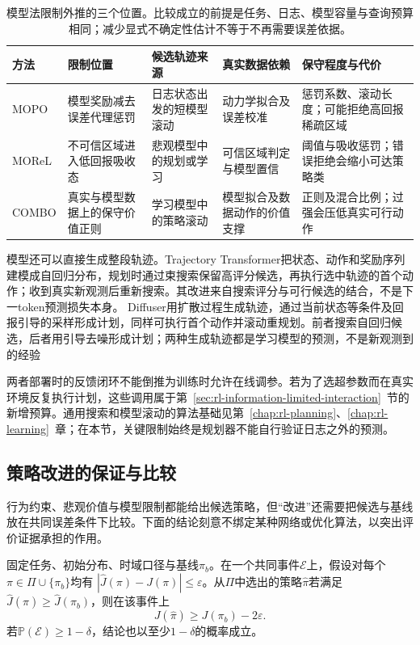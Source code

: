 \begin{table}[t]
  \centering
  \small
  \begin{tabularx}{\linewidth}{p{17mm}XXXX}
    \toprule
    方法 & 限制位置 & 候选轨迹来源 & 真实数据依赖 & 保守程度与代价 \\
    \midrule
    MOPO & 模型奖励减去误差代理惩罚 & 日志状态出发的短模型滚动 & 动力学拟合及误差校准 & 惩罚系数、滚动长度；可能拒绝高回报稀疏区域 \\
    MOReL & 不可信区域进入低回报吸收态 & 悲观模型中的规划或学习 & 可信区域判定与模型置信 & 阈值与吸收惩罚；错误拒绝会缩小可达策略类 \\
    COMBO & 真实与模型数据上的保守价值正则 & 学习模型中的策略滚动 & 模型拟合及数据动作的价值支撑 & 正则及混合比例；过强会压低真实可行动作 \\
    \bottomrule
  \end{tabularx}
  \caption{模型法限制外推的三个位置。比较成立的前提是任务、日志、模型容量与查询预算相同；减少显式不确定性估计不等于不再需要误差依据。}
  \label{tab:rl-information-model-methods}
\end{table}

模型还可以直接生成整段轨迹。Trajectory Transformer把状态、动作和奖励序列建模成自回归分布，规划时通过束搜索保留高评分候选，再执行选中轨迹的首个动作；收到真实新观测后重新搜索。其改进来自搜索评分与可行候选的结合，不是下一token预测损失本身。
Diffuser用扩散过程生成轨迹，通过当前状态等条件及回报引导的采样形成计划，同样可执行首个动作并滚动重规划。前者搜索自回归候选，后者用引导去噪形成计划；两种生成轨迹都是学习模型的预测，不是新观测到的经验

两者部署时的反馈闭环不能倒推为训练时允许在线调参。若为了选超参数而在真实环境反复执行计划，这些调用属于第~\ref{sec:rl-information-limited-interaction}~节的新增预算。通用搜索和模型滚动的算法基础见第~\ref{chap:rl-planning}、\ref{chap:rl-learning}~章；在本节，关键限制始终是规划器不能自行验证日志之外的预测。

\subsection{策略改进的保证与比较}
\label{sec:rl-information-improvement}

行为约束、悲观价值与模型限制都能给出候选策略，但“改进”还需要把候选与基线放在共同误差条件下比较。下面的结论刻意不绑定某种网络或优化算法，以突出评价证据承担的作用。

\begin{theorem}[共同误差事件上的基线性能控制]
  \label{thm:rl-information-improvement}
  固定任务、初始分布、时域口径与基线$\pi_b$。在一个共同事件$\mathcal E$上，假设对每个
  $\pi\in\Pi\cup\{\pi_b\}$均有
  $|\widehat J(\pi)-J(\pi)|\leq\varepsilon$。从$\Pi$中选出的策略$\widehat\pi$若满足
  $\widehat J(\widehat\pi)\geq\widehat J(\pi_b)$，则在该事件上
  \[
    J(\widehat\pi)\geq J(\pi_b)-2\varepsilon.
  \]
  若$\mathbb P(\mathcal E)\geq1-\delta$，结论也以至少$1-\delta$的概率成立。
\end{theorem}

